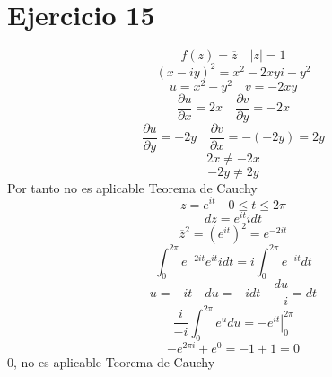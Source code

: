 \documentclass{article}
\begin{document}
\section{Ejercicio 15}
\[
f(z)= {\overline{z}} \quad |z|=1
\]
\begin{equation}
(x-iy)^2=x^2-2xyi-y^2
\end{equation}
\begin{equation}
u=x^2-y^2 \quad v=-2xy
\end{equation}
\begin{equation}
\frac{\partial u}{\partial x}= 2x \quad \frac{\partial v}{\partial y}= -2x
\end{equation}
\begin{equation}
\frac{\partial u}{\partial y}= -2y \quad \frac{\partial v}{\partial x}=-( -2y)=2y
\end{equation}
\begin{equation}
2x \neq -2x
\end{equation}
\begin{equation}
-2y \neq 2y
\end{equation}
Por tanto no es aplicable Teorema de Cauchy
\begin{equation}
z=e^{it} \quad 0\leq t\leq 2\pi
\end{equation}
\begin{equation}
dz=e^{it}i dt
\end{equation}
\begin{equation}
\overline{z}^2=(e^{it})^2=e^{-2it}
\end{equation}
\begin{equation}
\int_{0}^{2\pi}e^{-2it}e^{it}idt= i\int_{0}^{2\pi}e^{-it}dt
\end{equation}
\begin{equation}
u=-it \quad du=-idt \quad \frac{du}{-i}=dt
\end{equation}
\begin{equation}
\frac{i}{-i}\int_{0}^{2\pi} e^udu= \left.-e^{it}\right|_0^{2\pi}
\end{equation}
\begin{equation}
-e^{2\pi i}+e^0=-1+1=0
\end{equation}
0, no es aplicable Teorema de Cauchy
\end{document}
